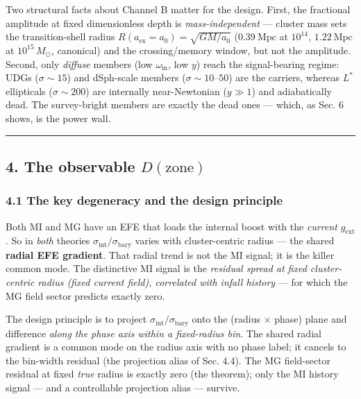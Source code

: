 \documentclass[
]{article}
\begin{document}
Two structural facts about Channel B matter for the design. First, the
fractional amplitude at fixed dimensionless depth is
\emph{mass-independent} --- cluster mass sets the transition-shell
radius \(R(a_\mathrm{ex}=a_0)=\sqrt{GM/a_0}\) (\(0.39\ \mathrm{Mpc}\) at
\(10^{14}\), \(1.22\ \mathrm{Mpc}\) at \(10^{15}\,M_\odot\), canonical)
and the crossing/memory window, but not the amplitude. Second, only
\emph{diffuse} members (low \(\omega_\mathrm{in}\), low \(y\)) reach the
signal-bearing regime: UDGs (\(\sigma\sim15\)) and dSph-scale members
(\(\sigma\sim10\)--\(50\)) are the carriers, whereas \(L^\ast\)
ellipticals (\(\sigma\sim200\)) are internally near-Newtonian
(\(y\gg1\)) and adiabatically dead. The survey-bright members are
exactly the dead ones --- which, as Sec. 6 shows, is the power wall.

\begin{center}\rule{0.5\linewidth}{0.5pt}\end{center}

\subsection{\texorpdfstring{4. The observable
\(D(\text{zone})\)}{4. The observable D(\textbackslash text\{zone\})}}\label{the-observable-dtextzone}

\subsubsection{4.1 The key degeneracy and the design
principle}\label{the-key-degeneracy-and-the-design-principle}

Both MI and MG have an EFE that loads the internal boost with the
\emph{current} \(g_\mathrm{ext}\). So in \emph{both} theories
\(\sigma_\mathrm{int}/\sigma_\mathrm{bary}\) varies with cluster-centric
radius --- the shared \textbf{radial EFE gradient}. That radial trend is
not the MI signal; it is the killer common mode. The distinctive MI
signal is the \emph{residual spread at fixed cluster-centric radius
(fixed current field), correlated with infall history} --- for which the
MG field sector predicts exactly zero.

The design principle is to project
\(\sigma_\mathrm{int}/\sigma_\mathrm{bary}\) onto the (radius \(\times\)
phase) plane and difference \emph{along the phase axis within a
fixed-radius bin}. The shared radial gradient is a common mode on the
radius axis with no phase label; it cancels to the bin-width residual
(the projection alias of Sec. 4.4). The MG field-sector residual at
fixed \emph{true} radius is exactly zero (the theorem); only the MI
history signal --- and a controllable projection alias --- survive.
\end{document}
